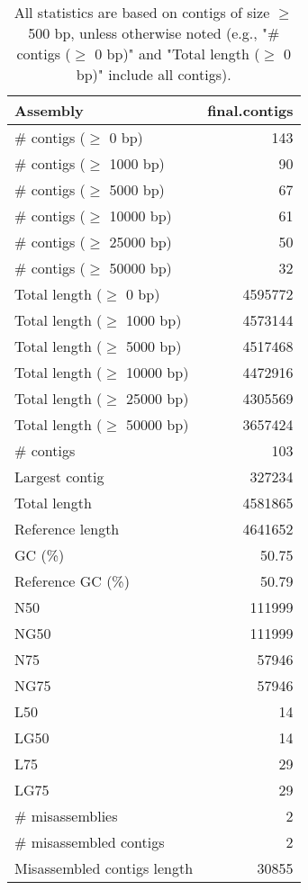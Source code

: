 \documentclass[12pt,a4paper]{article}
\begin{document}
\begin{table}[ht]
\begin{center}
\caption{All statistics are based on contigs of size $\geq$ 500 bp, unless otherwise noted (e.g., "\# contigs ($\geq$ 0 bp)" and "Total length ($\geq$ 0 bp)" include all contigs).}
\begin{tabular}{|l*{1}{|r}|}
\hline
Assembly & final.contigs \\ \hline
\# contigs ($\geq$ 0 bp) & 143 \\ \hline
\# contigs ($\geq$ 1000 bp) & 90 \\ \hline
\# contigs ($\geq$ 5000 bp) & 67 \\ \hline
\# contigs ($\geq$ 10000 bp) & 61 \\ \hline
\# contigs ($\geq$ 25000 bp) & 50 \\ \hline
\# contigs ($\geq$ 50000 bp) & 32 \\ \hline
Total length ($\geq$ 0 bp) & 4595772 \\ \hline
Total length ($\geq$ 1000 bp) & 4573144 \\ \hline
Total length ($\geq$ 5000 bp) & 4517468 \\ \hline
Total length ($\geq$ 10000 bp) & 4472916 \\ \hline
Total length ($\geq$ 25000 bp) & 4305569 \\ \hline
Total length ($\geq$ 50000 bp) & 3657424 \\ \hline
\# contigs & 103 \\ \hline
Largest contig & 327234 \\ \hline
Total length & 4581865 \\ \hline
Reference length & 4641652 \\ \hline
GC (\%) & 50.75 \\ \hline
Reference GC (\%) & 50.79 \\ \hline
N50 & 111999 \\ \hline
NG50 & 111999 \\ \hline
N75 & 57946 \\ \hline
NG75 & 57946 \\ \hline
L50 & 14 \\ \hline
LG50 & 14 \\ \hline
L75 & 29 \\ \hline
LG75 & 29 \\ \hline
\# misassemblies & 2 \\ \hline
\# misassembled contigs & 2 \\ \hline
Misassembled contigs length & 30855 \\ \hline

\end{tabular}
\end{center}
\end{table}
\end{document}
